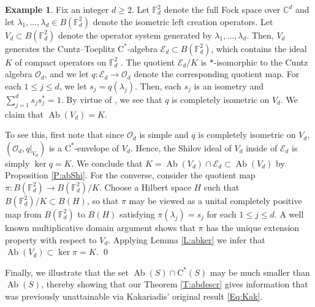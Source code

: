 \documentclass[10pt]{amsart}
\newcommand{\bC}{{\mathbb{C}}}
\newcommand{\bF}{{\mathbb{F}}}
\newcommand{\E}{{\mathcal{E}}}
\renewcommand{\O}{{\mathcal{O}}}
\newcommand{\rC}{\mathrm{C}}
\newcommand{\Ab}{\operatorname{Ab}}
\theoremstyle{definition}
\newtheorem{example}{Example}
\begin{document}
\begin{example}\label{E:Ed}
Fix an integer $d\geq 2$. Let $\bF^2_d$ denote the full Fock space over $\bC^d$ and let $\lambda_1,\ldots,\lambda_d\in B(\bF^2_d)$ denote the isometric left creation operators. Let $V_d\subset B(\bF^2_d)$ denote the operator system generated by $\lambda_1,\ldots,\lambda_d$. Then, $V_d$ generates the Cuntz--Toeplitz $\rC^*$-algebra $\E_d\subset B(\bF^2_d)$, which contains the ideal $K$ of compact operators on $\bF^2_d$ \cite[Theorem 1.3]{popescu2006}.  The quotient $\E_d/K$ is $*$-isomorphic to the Cuntz algebra $\O_d$, and we let $q :\E_d\to \O_d$ denote the corresponding quotient map. For each $1\leq j\leq d$, we let $s_j=q(\lambda_j)$. Then, each $s_j$ is an isometry and $\sum_{j=1}^d s_j s_j^*=1$. By virtue of \cite[Theorem 3.1]{popescu1996}, we see that $q$ is completely isometric on $V_d$.   We claim that $\Ab(V_d)=K$. 

To see this, first note that since $\O_d$ is simple and $q$ is completely isometric on $V_d$, $(\O_d,q|_{V_d})$ is a $\rC^*$-envelope of $V_d$. Hence, the Shilov ideal of $V_d$ inside of $\E_d$ is simply $\ker q=K$. We conclude that $K=\Ab(V_d)\cap\E_d\subset \Ab(V_d)$ by Proposition \ref{P:abShi}.  For the converse, consider the quotient map $\pi:B(\bF^2_d)\to B(\bF^2_d)/K$. Choose a Hilbert space $H$ such that $B(\bF^2_d)/K\subset B(H)$, so that $\pi$ may be viewed as a unital completely positive map from $B(\bF^2_d)$ to $B(H)$ satisfying $\pi(\lambda_j)=s_j$ for each $1\leq j\leq d$. A well known multiplicative domain argument shows that $\pi$ has the unique extension property with respect to  $V_d$. Applying Lemma \ref{L:abker} we infer that $\Ab(V_d)\subset \ker \pi=K$.
\qed
\end{example}


Finally, we illustrate that the set $\Ab(S)\cap \rC^*(S)$ may be much smaller than $\Ab(S)$, thereby showing that our Theorem \ref{T:abdescr} gives information that was previously unattainable via Kakariadis' original result \eqref{Eq:Kak}.
\end{document}
